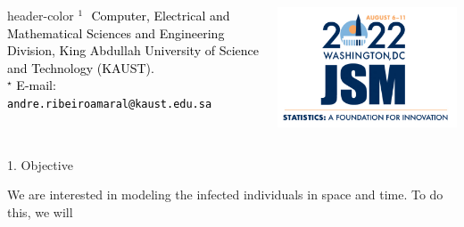 \documentclass[12pt]{beamer}
\begin{document}
\begin{frame}[t]
\begin{columns}[t]
\begin{column}{1\textwidth}
\begin{block}
\begin{columns}[T]
\begin{column}{0.67\textwidth}
\begin{beamercolorbox}[wd=1.00\textwidth]{header-color}
								{\footnotesize \textcolor{black}{
									${}^{1}\hspace{8pt}$Computer, Electrical and Mathematical Sciences and Engineering Division, King Abdullah University of Science and Technology (KAUST).  \\ \vspace{3pt}
									${}^{\star}$ E-mail: \texttt{andre.ribeiroamaral@kaust.edu.sa}
								}}
							\end{beamercolorbox}
							\vspace{24pt}
						\end{column}
						\begin{column}{0.13\textwidth}
							\vspace{20pt}
							\includegraphics[width=0.9\linewidth]{Images/JSM_logo}
						\end{column}
					\end{columns}
					
				\end{block}
			\end{column}
		\end{columns}
		
		
		\vspace{-4pt}
		\begin{columns}[t]
			\begin{column}{0.24175\textwidth} \justifying %
				
			\begin{block}{}
			\textcolor{strong-blue}{\Large 1. Objective} \justifying \vspace{12pt}
		
			We are interested in modeling the infected individuals in space and time. To do this, we will \vspace{6pt}
			

\end{block}
\end{column}
\end{columns}
\end{frame}
\end{document}
